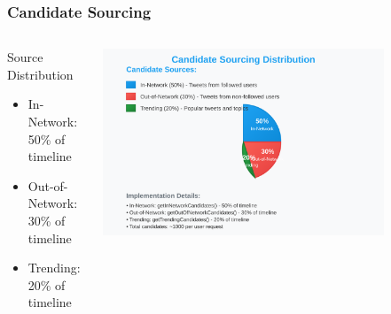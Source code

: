 \documentclass[aspectratio=169]{beamer}
\begin{document}
\begin{frame}
    \frametitle{Candidate Sourcing}
    \begin{columns}
        \begin{column}{0.6\textwidth}
            \begin{block}{Source Distribution}
                \begin{itemize}
                    \item In-Network: 50\% of timeline
                    \item Out-of-Network: 30\% of timeline
                    \item Trending: 20\% of timeline
                \end{itemize}
            \end{block}
        \end{column}
        \begin{column}{0.4\textwidth}
            \begin{center}
                \includegraphics[width=0.8\textwidth]{images/candidate-sourcing.svg}
            \end{center}
        \end{column}
    \end{columns}
\end{frame}
\end{document}
